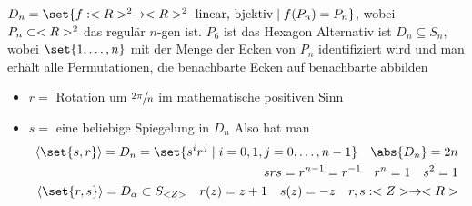 \begin{example}
	$D_n = \set{f: \R^2 \to \R^2 \text{ linear, bjektiv} \mid f(P_n) = P_n}$, wobei $P_n \subset <R>^2$ das regulär $n$-gen ist. $P_6$ ist das Hexagon %
	Alternativ ist $D_n \subseteq S_n$, wobei $\set{1, \dots,n}$ mit der Menge der Ecken von $P_n$ identifiziert wird und man erhält alle Permutationen, die benachbarte Ecken auf benachbarte abbilden
	\begin{itemize}
		\item $r = $ Rotation um $\sfrac{2\pi}{n}$ im mathematische positiven Sinn
		\item $s = $ eine beliebige Spiegelung in $D_n$
		Also hat man
		\begin{align*}
			\langle \set{s,r}\rangle = D_n = \set{s^i r^j \mid i = 0,1, j=0, \dots, n-1} \quad \abs{D_n} = 2n\\
			srs = r^{n-1} = r^{-1} \quad r^n = 1 \quad s^2 = 1\\
			\langle \set{r,s}\rangle= D_{\alpha} \subset S_{\Z} \quad r(z) = z+1 \quad s(z) = -z \quad r,s : \Z \to \R\\
		\end{align*}
	\end{itemize}
\end{example}
